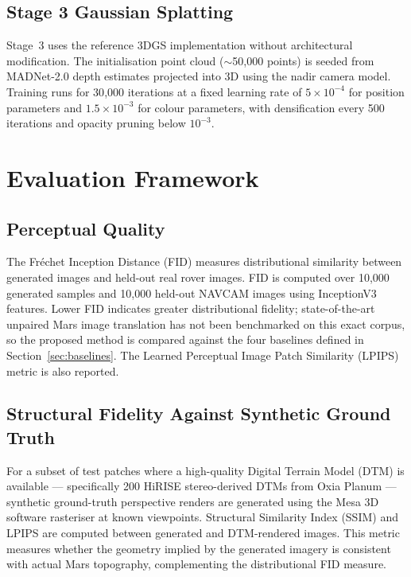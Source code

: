\documentclass[10pt,journal]{IEEEtran}
\begin{document}
\subsection{Stage 3 Gaussian Splatting}
Stage~3 uses the reference 3DGS implementation \cite{kerbl2023gaussian}
without architectural modification. The initialisation point cloud ($\sim$50{,}000
points) is seeded from MADNet-2.0 depth estimates \cite{tao2021madnet}
projected into 3D using the nadir camera model. Training runs for 30{,}000
iterations at a fixed learning rate of $5 \times 10^{-4}$ for position
parameters and $1.5 \times 10^{-3}$ for colour parameters, with densification
every 500 iterations and opacity pruning below $10^{-3}$.

\section{Evaluation Framework}
\label{sec:evaluation}

\subsection{Perceptual Quality}
The Fr\'{e}chet Inception Distance (FID) \cite{aithal2024hallucination} measures
distributional similarity between generated images and held-out real rover
images. FID is computed over 10{,}000 generated samples and 10{,}000 held-out
NAVCAM images using InceptionV3 features. Lower FID indicates greater
distributional fidelity; state-of-the-art unpaired Mars image translation has
not been benchmarked on this exact corpus, so the proposed method is compared
against the four baselines defined in Section~\ref{sec:baselines}.
The Learned Perceptual Image Patch Similarity (LPIPS) metric is also reported.

\subsection{Structural Fidelity Against Synthetic Ground Truth}
For a subset of test patches where a high-quality Digital Terrain Model (DTM)
is available --- specifically 200 HiRISE stereo-derived DTMs from Oxia Planum
--- synthetic ground-truth perspective renders are generated using the Mesa 3D
software rasteriser at known viewpoints. Structural Similarity Index (SSIM) and
LPIPS are computed between generated and DTM-rendered images. This metric
measures whether the geometry implied by the generated imagery is consistent
with actual Mars topography, complementing the distributional FID measure.
\end{document}
